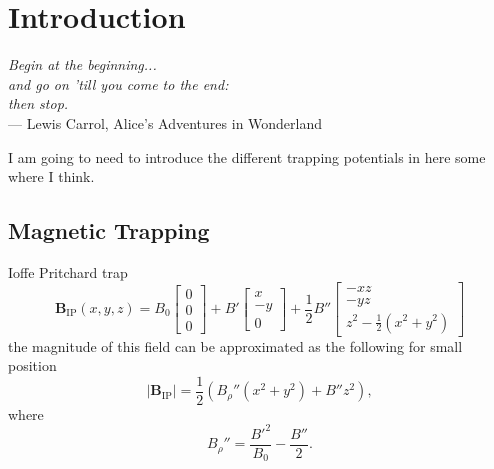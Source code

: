 
\chapter{Introduction} %

\label{ch:intro} %


\begin{flushright}{\slshape    
Begin at the beginning...\\
and go on 'till you come to the end:\\
then stop.} \\ \medskip
--- Lewis Carrol, Alice's Adventures in Wonderland
\end{flushright}

\bigskip



I am going to need to introduce the different trapping potentials in here some where I think.

\section{Magnetic Trapping} \label{sec:intromag}

Ioffe Pritchard trap
\begin{equation}
    \mathbf{B}_{\mathrm{IP}}(x,y,z) = B_0 \begin{bmatrix} 0\\ 0\\ 0 \end{bmatrix}
                      + B' \begin{bmatrix} x\\-y\\ 0 \end{bmatrix}
                      + \frac{1}{2}B'' \begin{bmatrix}-xz\\-yz\\ z^2-\frac{1}{2}\left(x^2+y^2\right) \end{bmatrix}
\end{equation}
the magnitude of this field can be approximated as the following for small position
\begin{equation}
    \left| \mathbf{B}_{\mathrm{IP}} \right| = \frac{1}{2}\left(B_{\rho}''\left(x^2+y^2\right) + B''z^2\right), \label{eq:ipmag}
\end{equation}
where 
\begin{equation*}
    B_\rho''= \frac{B'^2}{B_0} - \frac{B''}{2}. 
\end{equation*}


